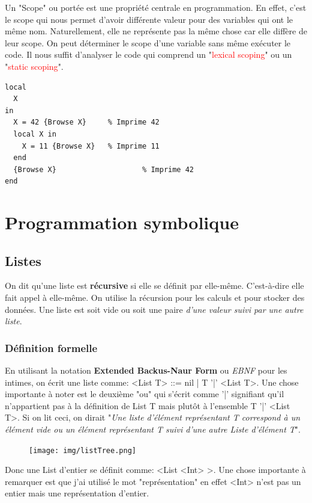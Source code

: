 \documentclass{report}
\begin{document}
Un "Scope" ou portée est une propriété centrale en programmation. En effet, c'est le scope qui nous permet d'avoir différente valeur pour des variables qui ont le même nom. Naturellement, elle ne représente pas la même chose car elle diffère de leur scope. On peut déterminer le scope d'une variable sans même exécuter le code. Il nous suffit d'analyser le code qui comprend un "\textcolor{red}{lexical scoping}" ou un "\textcolor{red}{static scoping}".
\begin{lstlisting}
local
  X
in 
  X = 42 {Browse X}		% Imprime 42
  local X in
    X = 11 {Browse X}	% Imprime 11
  end
  {Browse X}					% Imprime 42
end
\end{lstlisting}


\chapter{Programmation symbolique}
\section{Listes}
On dit qu'une liste est \textbf{récursive} si elle se définit par elle-même. C'est-à-dire elle fait appel à elle-même. On utilise la récursion pour les calculs et pour stocker des données.
Une liste est soit vide ou soit une paire \textit{d'une valeur suivi par une autre liste}.
\subsection{Définition formelle}
En utilisant la notation \textbf{Extended Backus-Naur Form} ou \textit{EBNF} pour les intimes, on écrit une liste comme: <List T> ::= nil | T '|' <List T>. Une chose importante à noter est le deuxième "ou" qui s'écrit comme '|' signifiant qu'il n'appartient pas à la définition de List T mais plutôt à l'ensemble T '|' <List T>. Si on lit ceci, on dirait "\textit{Une liste d'élément représentant T correspond à un élément vide ou un élément représentant T suivi d'une autre Liste d'élément T}".\\

\begin{figure}
	\centering
	\texttt{[image: img/listTree.png]}
\end{figure}
Donc une List d'entier se définit comme: <List <Int> >. Une chose importante à remarquer est que j'ai utilisé le mot "représentation" en effet <Int> n'est pas un entier mais une représentation d'entier.\\
\end{document}
